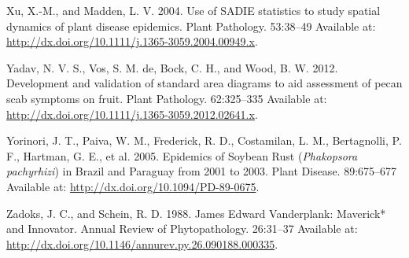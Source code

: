 \documentclass[
  letterpaper,
]{book}
\newlength{\cslhangindent}
\newlength{\cslentryspacingunit} %
\newenvironment{CSLReferences}[2] %
 {%
  \setlength{\parindent}{0pt}
  \ifodd #1
  \let\oldpar\par
  \def\par{\hangindent=\cslhangindent\oldpar}
  \fi
  \setlength{\parskip}{#2\cslentryspacingunit}
 }%
 {}
\begin{document}
\begin{CSLReferences}{0}{0}
\leavevmode{}%
Xu, X.-M., and Madden, L. V. 2004. Use of {SADIE} statistics to study
spatial dynamics of plant disease epidemics. Plant Pathology. 53:38--49
Available at: \url{http://dx.doi.org/10.1111/j.1365-3059.2004.00949.x}.

\leavevmode{}%
Yadav, N. V. S., Vos, S. M. de, Bock, C. H., and Wood, B. W. 2012.
Development and validation of standard area diagrams to aid assessment
of pecan scab symptoms on fruit. Plant Pathology. 62:325--335 Available
at: \url{http://dx.doi.org/10.1111/j.1365-3059.2012.02641.x}.

\leavevmode{}%
Yorinori, J. T., Paiva, W. M., Frederick, R. D., Costamilan, L. M.,
Bertagnolli, P. F., Hartman, G. E., et al. 2005. Epidemics of Soybean
Rust ({\emph{Phakopsora pachyrhizi}}) in Brazil and Paraguay from 2001
to 2003. Plant Disease. 89:675--677 Available at:
\url{http://dx.doi.org/10.1094/PD-89-0675}.

\leavevmode{}%
Zadoks, J. C., and Schein, R. D. 1988. James Edward Vanderplank:
Maverick* and Innovator. Annual Review of Phytopathology. 26:31--37
Available at:
\url{http://dx.doi.org/10.1146/annurev.py.26.090188.000335}.

\end{CSLReferences}


\backmatter
\end{document}
